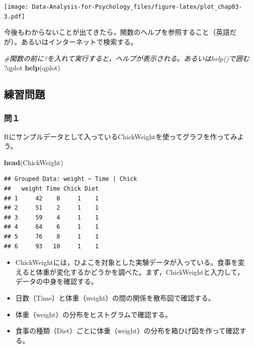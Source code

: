 \documentclass[]{article}
\newenvironment{Shaded}{\begin{snugshade}}{\end{snugshade}}
\newcommand{\KeywordTok}[1]{\textcolor[rgb]{0.13,0.29,0.53}{\textbf{#1}}}
\newcommand{\CommentTok}[1]{\textcolor[rgb]{0.56,0.35,0.01}{\textit{#1}}}
\newcommand{\NormalTok}[1]{#1}
\providecommand{\tightlist}{%
  \setlength{\itemsep}{0pt}\setlength{\parskip}{0pt}}
\begin{document}
\texttt{[image: Data-Analysis-for-Psychology\_files/figure-latex/plot\_chap03-3.pdf]}

今後もわからないことが出てきたら，関数のヘルプを参照すること（英語だが）。あるいはインターネットで検索する。

\begin{Shaded}
\begin{Highlighting}[]
\CommentTok{#関数の前に?を入れて実行すると，ヘルプが表示される。あるいはhelp()で囲む}
\NormalTok{?qplot}
\KeywordTok{help}\NormalTok{(qplot)}
\end{Highlighting}
\end{Shaded}

\subsection{練習問題}\label{-3}

\subsubsection{問１}\label{-6}

Rにサンプルデータとして入っているChickWeightを使ってグラフを作ってみよう。

\begin{Shaded}
\begin{Highlighting}[]
\KeywordTok{head}\NormalTok{(ChickWeight)}
\end{Highlighting}
\end{Shaded}

\begin{verbatim}
## Grouped Data: weight ~ Time | Chick
##   weight Time Chick Diet
## 1     42    0     1    1
## 2     51    2     1    1
## 3     59    4     1    1
## 4     64    6     1    1
## 5     76    8     1    1
## 6     93   10     1    1
\end{verbatim}

\begin{itemize}
\tightlist
\item
  ChickWeightには，ひよこを対象とした実験データが入っている。食事を変えると体重が変化するかどうかを調べた。まず，ChickWeightと入力して，データの中身を確認する。
\item
  日数（Time）と体重（weight）の間の関係を散布図で確認する。
\item
  体重（weight）の分布をヒストグラムで確認する。
\item
  食事の種類（Diet）ごとに体重（weight）の分布を箱ひげ図を作って確認する。
\end{itemize}
\end{document}
